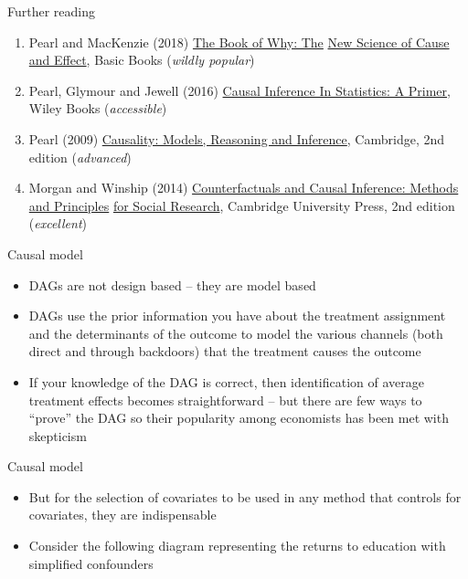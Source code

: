 \documentclass{beamer}
\begin{document}
\begin{frame}{Further reading}

  \begin{enumerate}

    \item Pearl and MacKenzie (2018) \underline{The Book of Why: The} \underline{New Science of Cause and Effect}, Basic Books (\emph{wildly popular})
    \item Pearl, Glymour and Jewell (2016) \underline{Causal Inference In Statistics: A Primer}, Wiley Books (\emph{accessible})
    \item Pearl (2009) \underline{Causality: Models, Reasoning and Inference}, Cambridge, 2nd edition (\emph{advanced})
    \item Morgan and Winship (2014) \underline{Counterfactuals and Causal Inference: Methods and Principles} \underline{for Social Research}, Cambridge University Press, 2nd edition (\emph{excellent})
  \end{enumerate}

\end{frame}




\begin{frame}{Causal model}

  \begin{itemize}
  \item DAGs are not design based -- they are model based
  \item DAGs use the prior information you have about the treatment assignment and the determinants of the outcome to model the various channels (both direct and through backdoors) that the treatment causes the outcome
	\item If your knowledge of the DAG is correct, then identification of average treatment effects becomes straightforward -- but there are few ways to ``prove'' the DAG so their popularity among economists has been met with skepticism
  \end{itemize}

\end{frame}

\begin{frame}{Causal model}

  \begin{itemize}
	\item But for the selection of covariates to be used in any method that controls for covariates, they are indispensable 
    \item Consider the following diagram representing the returns to education with simplified confounders
  \end{itemize}

\end{frame}
\end{document}
